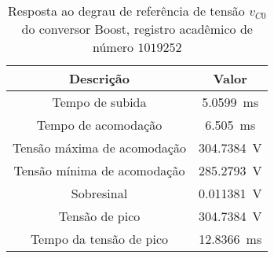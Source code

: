 \begin{table}[!ht]
\centering
\caption{Resposta ao degrau de referência de tensão $v_{C0}$ do conversor Boost, registro acadêmico de número $1019252$}
\label{tab:parametros}
\begin{tabular}{@{}cc@{}}
\toprule
\textbf{Descrição} & \textbf{Valor}\\ \midrule
Tempo de subida & \SI{5.0599}{\milli\s}\\
Tempo de acomodação & \SI{6.505}{\milli\s}\\
Tensão máxima de acomodação & \SI{304.7384}{\V}\\
Tensão mínima de acomodação & \SI{285.2793}{\V}\\
Sobresinal & \SI{0.011381}{\V}\\
Tensão de pico & \SI{304.7384}{\V}\\
Tempo da tensão de pico & \SI{12.8366}{\milli\s}\\
\bottomrule
\end{tabular}
\end{table}

